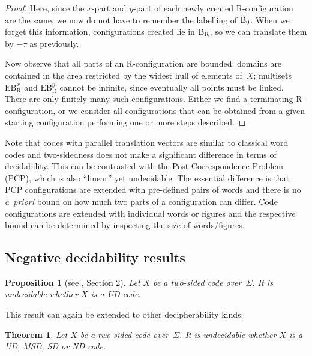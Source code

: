 \documentclass[final,nomarks]{dmtcs-episciences}
\newcommand{\confBegends}[2]{\mathrm{EB}^{#1}_{\mathrm #2}}
\newtheorem{theorem}{Theorem}
\newtheorem{proposition}{Proposition}
\begin{document}
\begin{proof}
Here, since the $x$-part and $y$-part of each newly created
R-configuration are the same, we now do not have to remember the
labelling of ${\mathrm B}_0$. When we forget this information,
configurations created lie in ${\mathrm B}_{\mathrm R}$, so we can translate
them by $-\tau$ as previously.

Now observe that all parts of an R-configuration are bounded:
domains are contained in the area restricted by the widest hull
of elements of~$X$; multisets $\confBegends{x}{R}$ and
$\confBegends{y}{R}$ cannot be infinite, since eventually all
points must be linked. There are only finitely many such
configurations. Either we find a terminating R-configuration, or
we consider all configurations that can be obtained from a given
starting configuration performing one or more steps
described.
\end{proof}


Note that codes with parallel translation vectors are similar to classical
word codes and two-sidedness does not make a significant difference in terms
of decidability. This can be contrasted with the Post Correspondence Problem (PCP),
which is also ``linear'' yet undecidable. The essential difference is that PCP
configurations are extended with pre-defined pairs of words and there is no
\textit{a~priori} bound on how much two parts of a configuration can differ.
Code configurations are extended with individual words or figures and 
the respective bound can be determined by inspecting the size of words/figures.

 
\subsection{Negative decidability results}


\begin{proposition}[see \cite{KolRAIRO}, Section 2]\label{prop:UDundecid}
Let $X$ be a two-sided code over~$\Sigma$. It is undecidable whether $X$
is a UD code.
\end{proposition}

This result can again be extended to other decipherability kinds:

\begin{theorem}\label{th:undec}
Let $X$ be a two-sided code over~$\Sigma$. It is undecidable whether $X$
is a UD, MSD, SD or ND code.
\end{theorem}
\end{document}
